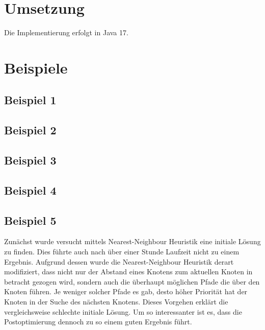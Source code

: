 \section{Umsetzung}\label{sec:umsetzung}
Die Implementierung erfolgt in Java 17.


\section{Beispiele}\label{sec:beispiele}

\subsection{Beispiel 1}\label{subsec:beispiel-1}

\subsection{Beispiel 2}\label{subsec:beispiel-2}

\subsection{Beispiel 3}\label{subsec:beispiel-3}

\subsection{Beispiel 4}\label{subsec:beispiel-4}

\subsection{Beispiel 5}\label{subsec:beispiel-5}
Zunächst wurde versucht mittels Nearest-Neighbour Heuristik eine initiale Lösung zu finden.
Dies führte auch nach über einer Stunde Laufzeit nicht zu einem Ergebnis.
Aufgrund dessen wurde die Nearest-Neighbour Heuristik derart modifiziert, dass nicht nur
der Abstand eines Knotens zum aktuellen Knoten in betracht gezogen wird, sondern auch
die überhaupt möglichen Pfade die über den Knoten führen.
Je weniger solcher Pfade es gab, desto höher Priorität hat der Knoten in der Suche des nächsten Knotens.
Dieses Vorgehen erklärt die vergleichsweise schlechte initiale Lösung.
Um so interessanter ist es, dass die Postoptimierung dennoch zu so einem guten Ergebnis führt. \\

